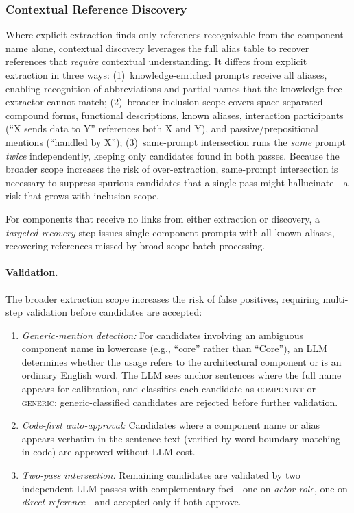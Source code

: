 \subsubsection{Contextual Reference Discovery}\label{sec:entity}

Where explicit extraction finds only references recognizable from
the component name alone, contextual discovery leverages the full
alias table to recover references that \emph{require} contextual
understanding.
It differs from explicit extraction in three ways:
(1)~knowledge-enriched prompts receive all aliases, enabling
recognition of abbreviations and partial names that the
knowledge-free extractor cannot match;
(2)~broader inclusion scope covers space-separated compound forms,
functional descriptions, known aliases, interaction participants
(``X sends data to Y'' references both X and Y), and
passive/prepositional mentions (``handled by X'');
(3)~same-prompt intersection runs the \emph{same} prompt
\emph{twice} independently, keeping only candidates found in both
passes.
Because the broader scope increases the risk of over-extraction,
same-prompt intersection is necessary to suppress spurious candidates
that a single pass might hallucinate---a risk that grows with
inclusion scope.

For components that receive no links from either extraction or
discovery, a \emph{targeted recovery} step issues single-component
prompts with all known aliases, recovering references missed by
broad-scope batch processing.

\paragraph{Validation.}
The broader extraction scope increases the risk of false
positives, requiring multi-step validation before candidates
are accepted:
\begin{enumerate}
    \item \emph{Generic-mention detection:}
      For candidates involving an ambiguous component name in lowercase
      (e.g., ``core'' rather than ``Core''), an LLM determines whether
      the usage refers to the architectural component or is an ordinary
      English word.
      The LLM sees anchor sentences where the full name appears for
      calibration, and classifies each candidate as \textsc{component}
      or \textsc{generic}; generic-classified candidates are rejected
      before further validation.
    \item \emph{Code-first auto-approval:}
      Candidates where a component name or alias appears verbatim
      in the sentence text (verified by word-boundary matching in
      code) are approved without LLM cost.
    \item \emph{Two-pass intersection:}
      Remaining candidates are validated by two independent LLM passes
      with complementary foci---one on \emph{actor role}, one on
      \emph{direct reference}---and accepted only if both approve.
\end{enumerate}

